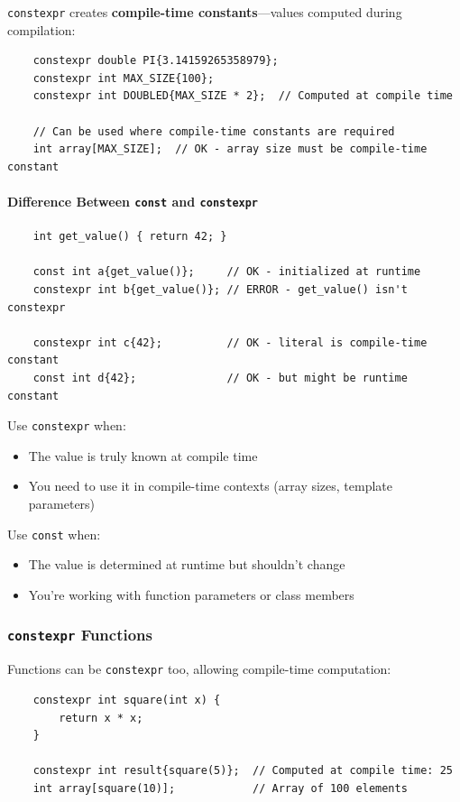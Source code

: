 \texttt{constexpr} creates \textbf{compile-time constants}—values computed during compilation:

\begin{lstlisting}
	constexpr double PI{3.14159265358979};
	constexpr int MAX_SIZE{100};
	constexpr int DOUBLED{MAX_SIZE * 2};  // Computed at compile time
	
	// Can be used where compile-time constants are required
	int array[MAX_SIZE];  // OK - array size must be compile-time constant
\end{lstlisting}

\paragraph{Difference Between \texttt{const} and \texttt{constexpr}}

\begin{lstlisting}
	int get_value() { return 42; }
	
	const int a{get_value()};     // OK - initialized at runtime
	constexpr int b{get_value()}; // ERROR - get_value() isn't constexpr
	
	constexpr int c{42};          // OK - literal is compile-time constant
	const int d{42};              // OK - but might be runtime constant
\end{lstlisting}

Use \texttt{constexpr} when:
\begin{itemize}
	\item The value is truly known at compile time
	\item You need to use it in compile-time contexts (array sizes, template parameters)
\end{itemize}

Use \texttt{const} when:
\begin{itemize}
	\item The value is determined at runtime but shouldn't change
	\item You're working with function parameters or class members
\end{itemize}

\subsubsection{\texttt{constexpr} Functions}

Functions can be \texttt{constexpr} too, allowing compile-time computation:

\begin{lstlisting}
	constexpr int square(int x) {
		return x * x;
	}
	
	constexpr int result{square(5)};  // Computed at compile time: 25
	int array[square(10)];            // Array of 100 elements
\end{lstlisting}

